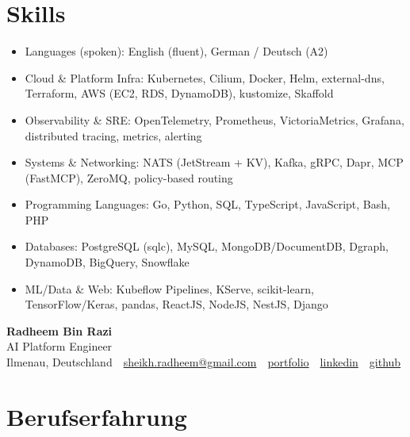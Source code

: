 \documentclass[10pt,a4paper]{resume}
\makeatletter
\newcommand{\Portfolio}{https://radheem.github.io/my-cv}
\newcommand{\PortfolioText}{portfolio}
\newcommand{\GitHub}{https://github.com/radheem}
\newcommand{\LinkedIn}{https://www.linkedin.com/in/radheem-razi}
\newcommand{\Email}{sheikh.radheem@gmail.com}
\makeatother
\begin{document}
\section{Skills}

\begin{itemize}[leftmargin=1.4em,nosep,topsep=2pt]
  \item Languages (spoken): English (fluent), German / Deutsch (A2)
  \item Cloud \& Platform Infra: Kubernetes, Cilium, Docker, Helm, external-dns, Terraform, AWS (EC2, RDS, DynamoDB), kustomize, Skaffold
  \item Observability \& SRE: OpenTelemetry, Prometheus, VictoriaMetrics, Grafana, distributed tracing, metrics, alerting
  \item Systems \& Networking: NATS (JetStream + KV), Kafka, gRPC, Dapr, MCP (FastMCP), ZeroMQ, policy-based routing
  \item Programming Languages: Go, Python, SQL, TypeScript, JavaScript, Bash, PHP
  \item Databases: PostgreSQL (sqlc), MySQL, MongoDB/DocumentDB, Dgraph, DynamoDB, BigQuery, Snowflake
  \item ML/Data \& Web: Kubeflow Pipelines, KServe, scikit-learn, TensorFlow/Keras, pandas, ReactJS, NodeJS, NestJS, Django
\end{itemize}

\clearpage
{}

\begin{center}
  {\huge\bfseries Radheem Bin Razi}\\[3pt]
  {\large AI Platform Engineer}\\[6pt]
  \small
  Ilmenau, Deutschland \,\textbar\,
  \href{mailto:\Email}{\Email} \,\textbar\,
  \href{\Portfolio}{\PortfolioText} \,\textbar\,
  \href{\LinkedIn}{linkedin} \,\textbar\,
  \href{\GitHub}{github}
\end{center}
\vspace{2pt}

\section{Berufserfahrung}
\end{document}
